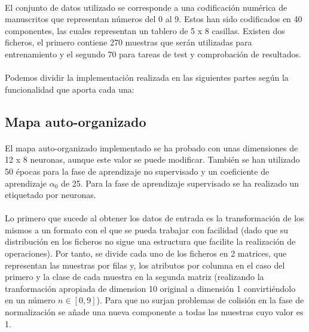 \documentclass[10pt, a4paper,spanish]{article}
\begin{document}
		\paragraph{}
		El conjunto de datos utilizado se corresponde a una codificación numérica de manuscritos que representan números del 0 al 9. Estos han sido codificados en 40 componentes, las cuales representan un tablero de 5 x 8 casillas. Existen dos ficheros, el primero contiene 270 muestras que serán utilizadas para entrenamiento y el segundo 70 para tareas de test y comprobación de resultados.

		\paragraph{}
		Podemos dividir la implementación realizada en las siguientes partes según la funcionalidad que aporta cada una:

		\subsection{Mapa auto-organizado}

			\paragraph{}
			El mapa auto-organizado implementado se ha probado con unas dimensiones de 12 x 8 neuronas, aunque este valor se puede modificar. También se han utilizado 50 épocas para la fase de aprendizaje no supervisado y un coeficiente de aprendizaje $\alpha_0$ de 25. Para la fase de aprendizaje supervisado se ha realizado un etiquetado por neuronas.

			\paragraph{}
			Lo primero que sucede al obtener los datos de entrada es la transformación de los mismos a un formato con el que se pueda trabajar con facilidad (dado que su distribución en los ficheros no sigue una estructura que facilite la realización de operaciones). Por tanto, se divide cada uno de los ficheros en 2 matrices, que representan las muestras por filas y, los atributos por columna en el caso del primero y la clase de cada muestra en la segunda matriz (realizando la tranformación apropiada de dimension 10 original a dimensión 1 convirtiéndolo en un número $n \in [0,9]$). Para que no surjan problemas de colisión en la fase de normalización se añade una nueva componente a todas las muestras cuyo valor es 1.
\end{document}
